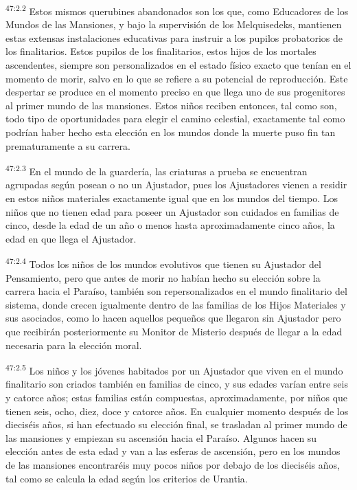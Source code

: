 \par
\textsuperscript{47:2.2} Estos mismos querubines abandonados son los que, como Educadores de los Mundos de las Mansiones, y bajo la supervisión de los Melquisedeks, mantienen estas extensas instalaciones educativas para instruir a los pupilos probatorios de los finalitarios. Estos pupilos de los finalitarios, estos hijos de los mortales ascendentes, siempre son personalizados en el estado físico exacto que tenían en el momento de morir, salvo en lo que se refiere a su potencial de reproducción. Este despertar se produce en el momento preciso en que llega uno de sus progenitores al primer mundo de las mansiones. Estos niños reciben entonces, tal como son, todo tipo de oportunidades para elegir el camino celestial, exactamente tal como podrían haber hecho esta elección en los mundos donde la muerte puso fin tan prematuramente a su carrera.

\par
\textsuperscript{47:2.3} En el mundo de la guardería, las criaturas a prueba se encuentran agrupadas según posean o no un Ajustador, pues los Ajustadores vienen a residir en estos niños materiales exactamente igual que en los mundos del tiempo. Los niños que no tienen edad para poseer un Ajustador son cuidados en familias de cinco, desde la edad de un año o menos hasta aproximadamente cinco años, la edad en que llega el Ajustador.

\par
\textsuperscript{47:2.4} Todos los niños de los mundos evolutivos que tienen su Ajustador del Pensamiento, pero que antes de morir no habían hecho su elección sobre la carrera hacia el Paraíso, también son repersonalizados en el mundo finalitario del sistema, donde crecen igualmente dentro de las familias de los Hijos Materiales y sus asociados, como lo hacen aquellos pequeños que llegaron sin Ajustador pero que recibirán posteriormente su Monitor de Misterio después de llegar a la edad necesaria para la elección moral.

\par
\textsuperscript{47:2.5} Los niños y los jóvenes habitados por un Ajustador que viven en el mundo finalitario son criados también en familias de cinco, y sus edades varían entre seis y catorce años; estas familias están compuestas, aproximadamente, por niños que tienen seis, ocho, diez, doce y catorce años. En cualquier momento después de los dieciséis años, si han efectuado su elección final, se trasladan al primer mundo de las mansiones y empiezan su ascensión hacia el Paraíso. Algunos hacen su elección antes de esta edad y van a las esferas de ascensión, pero en los mundos de las mansiones encontraréis muy pocos niños por debajo de los dieciséis años, tal como se calcula la edad según los criterios de Urantia.

